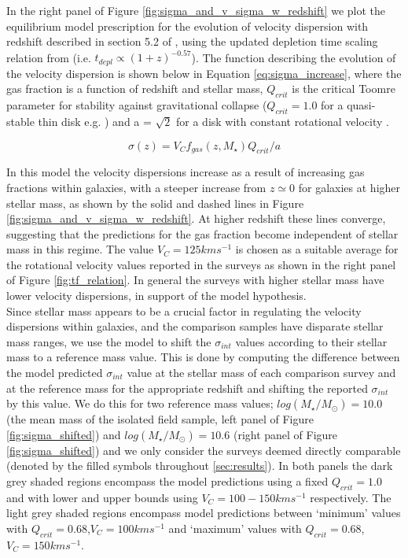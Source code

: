 \documentclass[fleqn,usenatbib]{mn2e}
\begin{document}
In the right panel of Figure \ref{fig:sigma_and_v_sigma_w_redshift} we plot the equilibrium model prescription for the evolution of velocity dispersion with redshift described in section 5.2 of \cite{Wisnioski2015}, using the updated depletion time scaling relation from \cite{Tacconi2017} (i.e. $t_{depl} \propto (1 + z)^{-0.57}$).
The function describing the evolution of the velocity dispersion is shown below in Equation \ref{eq:sigma_increase}, where the gas fraction is a function of redshift and stellar mass, $Q_{crit}$ is the critical Toomre parameter for stability against gravitational collapse \citep{Toomre1964} ($Q_{crit} = 1.0$ for a quasi-stable thin disk e.g. \citealt{ForsterSchreiber2006,Burkert2010,Genzel2011,Wisnioski2015}) and a = $\sqrt{2}$ for a disk with constant rotational velocity \citep{Wisnioski2015}. 

\begin{equation}\label{eq:sigma_increase}
    \sigma(z) = V_{C}f_{gas}(z,M_{\star})Q_{crit}/a
\end{equation}

In this model the velocity dispersions increase as a result of increasing gas fractions within galaxies, with a steeper increase from $z\simeq0$ for galaxies at higher stellar mass, as shown by the solid and dashed lines in Figure \ref{fig:sigma_and_v_sigma_w_redshift}.
At higher redshift these lines converge, suggesting that the predictions for the gas fraction become independent of stellar mass in this regime.
The value $V_{C}=125kms^{-1}$ is chosen as a suitable average for the rotational velocity values reported in the surveys as shown in the right panel of Figure \ref{fig:tf_relation}.
In general the surveys with higher stellar mass have lower velocity dispersions, in support of the model hypothesis. \\

Since stellar mass appears to be a crucial factor in regulating the velocity dispersions within galaxies, and the comparison samples have disparate stellar mass ranges, we use the model to shift the $\sigma_{int}$ values according to their stellar mass to a reference mass value.
This is done by computing the difference between the model predicted $\sigma_{int}$ value at the stellar mass of each comparison survey and at the reference mass for the appropriate redshift and shifting the reported $\sigma_{int}$ by this value.
We do this for two reference mass values; $log(M_{\star}/M_{\odot}) = 10.0$ (the mean mass of the isolated field sample, left panel of Figure \ref{fig:sigma_shifted}) and $log(M_{\star}/M_{\odot}) = 10.6$ (right panel of Figure \ref{fig:sigma_shifted}) and we only consider the surveys deemed directly comparable (denoted by the filled symbols throughout \cref{sec:results}).
In both panels the dark grey shaded regions encompass the model predictions using a fixed $Q_{crit} = 1.0$ and with lower and upper bounds using $V_{C} = 100-150kms^{-1}$ respectively.
The light grey shaded regions encompass model predictions between `minimum' values with $Q_{crit} = 0.68$,$V_{C}=100kms^{-1}$ and `maximum' values with $Q_{crit} = 0.68$,$V_{C}=150kms^{-1}$. \\
\end{document}
